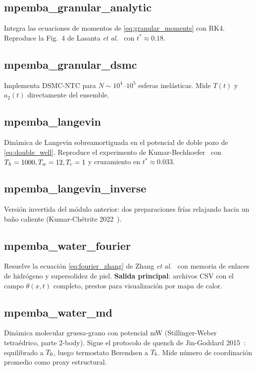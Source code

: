 \subsection{mpemba\_granular\_analytic}
Integra las ecuaciones de momentos de \cref{eq:granular_moments} con RK4. 
Reproduce la Fig.~4 de Lasanta \emph{et al.}~\cite{lasanta2017} con 
$t^{\ast} \approx 0.18$.

\subsection{mpemba\_granular\_dsmc}
Implementa DSMC-NTC para $N \sim 10^4$--$10^5$ esferas inelásticas. Mide 
$T(t)$ y $a_2(t)$ directamente del ensemble.

\subsection{mpemba\_langevin}
Dinámica de Langevin sobreamortiguada en el potencial de doble pozo de 
\cref{eq:double_well}. Reproduce el experimento de 
Kumar-Bechhoefer~\cite{kumar2020} con $T_{h} = 1000, T_{w} = 12, T_{c} = 1$ y 
cruzamiento en $t^{\ast} \approx 0.033$.

\subsection{mpemba\_langevin\_inverse}
Versión invertida del módulo anterior: dos preparaciones frías relajando hacia 
un baño caliente (Kumar-Chétrite 2022~\cite{kumarchetrite2022}).

\subsection{mpemba\_water\_fourier}
Resuelve la ecuación \cref{eq:fourier_zhang} de Zhang \emph{et al.}~\cite{zhang2014} 
con memoria de enlaces de hidrógeno y supersolidez de piel. \textbf{Salida 
principal}: archivos CSV con el campo $\theta(x, t)$ completo, prestos para 
visualización por mapa de calor.

\subsection{mpemba\_water\_md}
Dinámica molecular gruesa-grano con potencial mW (Stillinger-Weber tetraédrico, 
parte 2-body). Sigue el protocolo de quench de Jin-Goddard 2015~\cite{jin_goddard2015}: 
equilibrado a $T_{0}$, luego termostato Berendsen a $T_{b}$. Mide número de 
coordinación promedio como proxy estructural.

